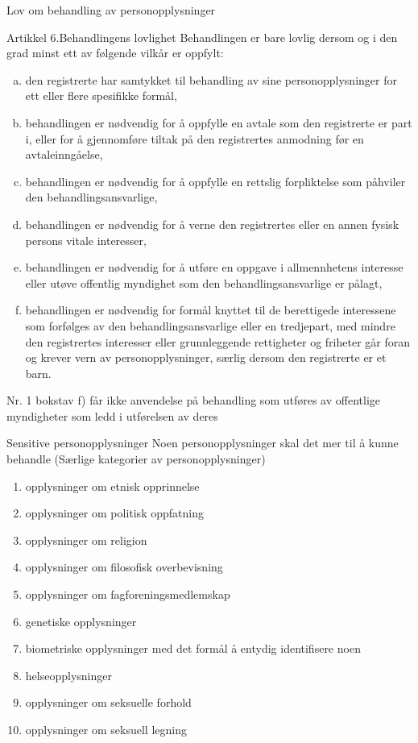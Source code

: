 \documentclass[aspectratio=169]{beamer}
\begin{document}
\begin{frame}{Lov om behandling av personopplysninger}
   \begin{block}{Artikkel 6.Behandlingens lovlighet}
Behandlingen er bare lovlig dersom og i den grad minst ett av følgende vilkår er oppfylt:
\scriptsize
      \begin{enumerate}[a.]
         \item	{den registrerte har samtykket til behandling av sine personopplysninger for ett eller flere spesifikke formål,}
         \item {behandlingen er nødvendig for å oppfylle en avtale som den registrerte er part i, eller for å gjennomføre tiltak på den registrertes anmodning før en avtaleinngåelse,}
         \item {behandlingen er nødvendig for å oppfylle en rettslig forpliktelse som påhviler den behandlingsansvarlige,}
         \item {behandlingen er nødvendig for å verne den registrertes eller en annen fysisk persons vitale interesser,}
         \item {behandlingen er nødvendig for å utføre en oppgave i allmennhetens interesse eller utøve offentlig myndighet som den behandlingsansvarlige er pålagt,}
         \item {behandlingen er nødvendig for formål knyttet til de berettigede interessene som forfølges av den behandlingsansvarlige eller en tredjepart, med mindre den registrertes interesser eller grunnleggende rettigheter og friheter går foran og krever vern av personopplysninger, særlig dersom den registrerte er et barn.}
      \end{enumerate}
   \end{block}
Nr. 1 bokstav f) får ikke anvendelse på behandling som utføres av offentlige myndigheter som ledd i utførelsen av deres 
\end{frame}

\begin{frame}{Sensitive personopplysninger}
   Noen personopplysninger skal det mer til å kunne behandle (Særlige kategorier av personopplysninger)
   \begin{enumerate}
      \item {opplysninger om etnisk opprinnelse}
      \item {opplysninger om politisk oppfatning}
      \item {opplysninger om religion}
      \item {opplysninger om filosofisk overbevisning}
      \item {opplysninger om fagforeningsmedlemskap}
      \item {genetiske opplysninger}
      \item {biometriske opplysninger med det formål å entydig identifisere noen}
      \item {helseopplysninger}
      \item {opplysninger om seksuelle forhold}
      \item {opplysninger om seksuell legning}

   \end{enumerate}
   
\end{frame}
\end{document}
